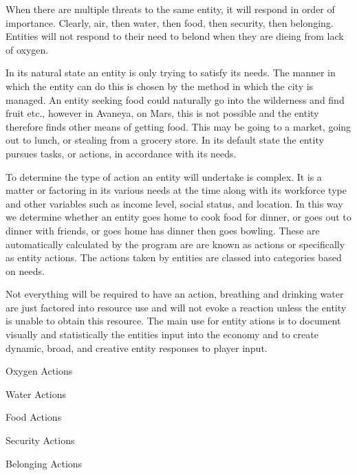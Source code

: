 When there are multiple threats to the same entity, it will respond in order of importance. Clearly, air, then water, then food, then security, then belonging. Entities will not respond to their need to belond when they are dieing from lack of oxygen.

In its natural state an entity is only trying to satisfy its needs. The manner in which the entity can do this is chosen by the method in which the city is managed. An entity seeking food could naturally go into the wilderness and find fruit etc., however in Avaneya, on Mars, this is not possible and the entity therefore finds other means of getting food. This may be going to a market, going out to lunch, or stealing from a grocery store. In its default state the entity pursues tasks, or actions, in accordance with its needs.

To determine the type of action an entity will undertake is complex. It is a matter or factoring in its various needs at the time along with its workforce type and other variables such as income level, social status, and location. In this way we determine whether an entity goes home to cook food for dinner, or goes out to dinner with friends, or goes home has dinner then goes bowling. These are automatically calculated by the program are are known as actions or specifically as entity actions. The actions taken by entities are classed into categories based on needs. 

Not everything will be required to have an action, breathing and drinking water are just factored into resource use and will not evoke a reaction unless the entity is unable to obtain this resource. The main use for entity ations is to document visually and statistically the entities input into the economy and to create dynamic, broad, and creative entity responses to player input.

Oxygen Actions


Water Actions



Food Actions



Security Actions



Belonging Actions








 











